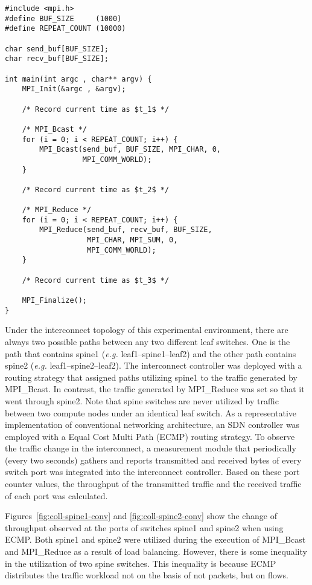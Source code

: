 \begin{lstlisting}[caption={Source code of MPI application}, label=lst:sync-mpi-app, float=htbp]
#include <mpi.h>
#define BUF_SIZE     (1000)
#define REPEAT_COUNT (10000)

char send_buf[BUF_SIZE];
char recv_buf[BUF_SIZE];

int main(int argc , char** argv) {
    MPI_Init(&argc , &argv);

    /* Record current time as $t_1$ */

    /* MPI_Bcast */
    for (i = 0; i < REPEAT_COUNT; i++) {
        MPI_Bcast(send_buf, BUF_SIZE, MPI_CHAR, 0,
                  MPI_COMM_WORLD);
    }

    /* Record current time as $t_2$ */

    /* MPI_Reduce */
    for (i = 0; i < REPEAT_COUNT; i++) {
        MPI_Reduce(send_buf, recv_buf, BUF_SIZE,
                   MPI_CHAR, MPI_SUM, 0,
                   MPI_COMM_WORLD);
    }

    /* Record current time as $t_3$ */

    MPI_Finalize();
}
\end{lstlisting}

Under the interconnect topology of this experimental environment, there
are always two possible paths between any two different leaf switches.
One is the path that contains spine1 (\emph{e.g.} leaf1--spine1--leaf2) and
the other path contains spine2 (\emph{e.g.} leaf1--spine2--leaf2). The
interconnect controller was deployed with a routing strategy that assigned
paths utilizing spine1 to the traffic generated by MPI\_Bcast. In contrast,
the traffic generated by MPI\_Reduce was set so that it went through spine2.
Note that spine switches are never utilized by traffic between two compute
nodes under an identical leaf switch. As a representative implementation of
conventional networking architecture, an SDN controller was employed with a
Equal Cost Multi Path (ECMP) routing strategy. To observe the traffic change
in the interconnect, a measurement module that periodically (every two
seconds) gathers and reports transmitted and received bytes of every switch
port was integrated into the interconnect controller. Based on these port
counter values, the throughput of the transmitted traffic and the received
traffic of each port was calculated.

Figures~\ref{fig:coll-spine1-conv} and \ref{fig:coll-spine2-conv} show
the change of throughput observed at the ports of switches spine1 and
spine2 when using ECMP\@. Both spine1 and spine2 were utilized during the
execution of MPI\_Bcast and MPI\_Reduce as a result of load balancing.
However, there is some inequality in the utilization of two spine
switches. This inequality is because ECMP distributes the traffic
workload not on the basis of not packets, but on flows.

